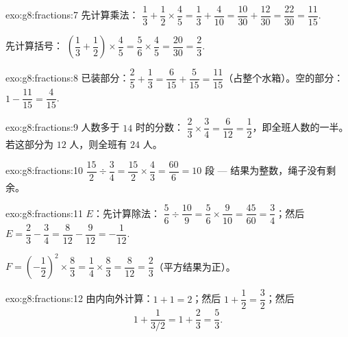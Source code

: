\begin{solution}{exo:g8:fractions:7}
先计算乘法：
$\dfrac13 + \dfrac12 \times \dfrac45 = \dfrac13 + \dfrac{4}{10}
= \dfrac{10}{30} + \dfrac{12}{30} = \dfrac{22}{30} = \dfrac{11}{15}$.

先计算括号：
$\left(\dfrac13 + \dfrac12\right) \times \dfrac45
= \dfrac56 \times \dfrac45 = \dfrac{20}{30} = \dfrac23$.
\end{solution}

\begin{solution}{exo:g8:fractions:8}
已装部分：$\dfrac25 + \dfrac13 = \dfrac{6}{15} + \dfrac{5}{15} =
\dfrac{11}{15}$（占整个水箱）。空的部分：
$1 - \dfrac{11}{15} = \dfrac{4}{15}$.
\end{solution}

\begin{solution}{exo:g8:fractions:9}
人数多于 $14$ 时的分数：
$\dfrac23 \times \dfrac34 = \dfrac{6}{12} = \dfrac12$，即全班人数的一半。
若这部分为 $12$ 人，则全班有 $24$ 人。
\end{solution}

\begin{solution}{exo:g8:fractions:10}
$\dfrac{15}{2} \div \dfrac34 = \dfrac{15}{2} \times \dfrac43
= \dfrac{60}{6} = 10$ 段 --- 结果为整数，绳子没有剩余。
\end{solution}

\begin{solution}{exo:g8:fractions:11}
$E$：先计算除法：
$\dfrac56 \div \dfrac{10}{9} = \dfrac56 \times \dfrac{9}{10}
= \dfrac{45}{60} = \dfrac34$；然后
$E = \dfrac23 - \dfrac34 = \dfrac{8}{12} - \dfrac{9}{12} =
-\dfrac{1}{12}$.

$F = \left(-\dfrac12\right)^2 \times \dfrac83 = \dfrac14 \times
\dfrac83 = \dfrac{8}{12} = \dfrac23$（平方结果为正）。
\end{solution}

\begin{solution}{exo:g8:fractions:12}
由内向外计算：$1 + 1 = 2$；然后
$1 + \dfrac12 = \dfrac32$；然后
\[
1 + \frac{1}{3/2} = 1 + \frac23 = \frac53 .
\]
\end{solution}

